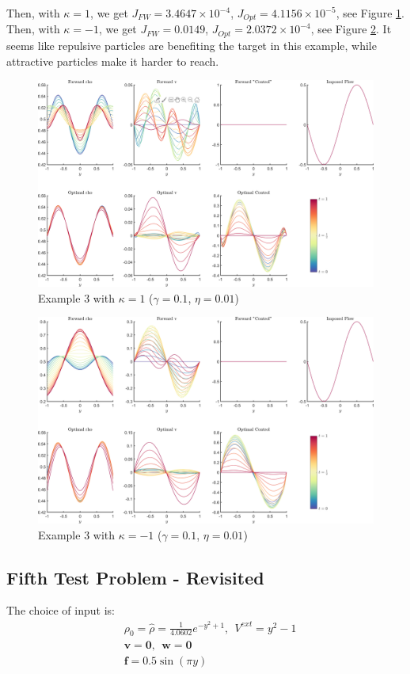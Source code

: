 \documentclass[11pt, a4paper]{article}
\theoremstyle{definition}
\newcommand{\Sta}{\rho}
\newcommand{\Stav}{\mathbf{v}}
\newcommand{\Con}{\mathbf{f}}
\begin{document}
Then, with $\kappa = 1$, we get $J_{FW} = 3.4647 \times 10^{-4}$, $J_{Opt} = 4.1156 \times 10^{-5}$, see Figure \ref{fig3I1a}.
Then, with $\kappa = -1$, we get $J_{FW} = 0.0149$, $J_{Opt} = 2.0372 \times 10^{-4}$, see Figure \ref{fig3In1a}.
It seems like repulsive particles are benefiting the target in this example, while attractive particles make it harder to reach.

\begin{figure}
	\includegraphics[scale=0.05]{ExampleI13.png}
	\caption{Example 3 with $\kappa = 1$ ($\gamma = 0.1$, $\eta = 0.01$)}
	\label{fig3I1a}
\end{figure} 
\begin{figure}
	\includegraphics[scale=0.05]{ExampleIn13.png}
	\caption{Example 3 with $\kappa = -1$ ($\gamma = 0.1$, $\eta = 0.01$)}
	\label{fig3In1a}
\end{figure} 

\subsection{Fifth Test Problem - Revisited}
The choice of input is:
\begin{align*}
&\Sta_0 = \hat \Sta =  \frac{1}{4.0602}e^{- y^2 + 1}, \ \ V^{ext} = y^2 - 1\\
&\Stav = \mathbf{0}, \ \  \mathbf{w} = \mathbf{0}\\
&\Con = 0.5 \sin(\pi y) 
\end{align*}
\end{document}

